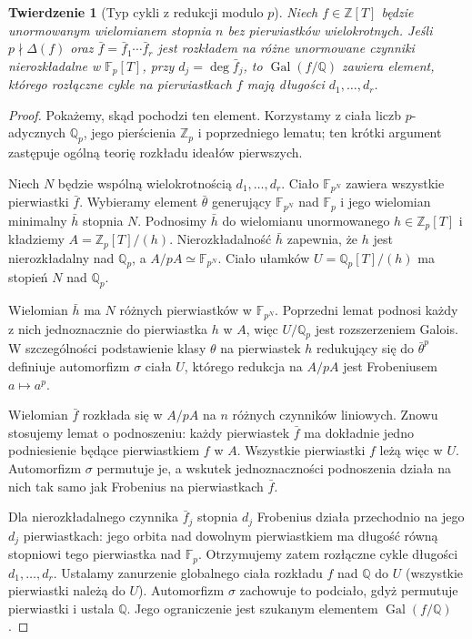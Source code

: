 \documentclass[11pt,a4paper,oneside]{book}
\numberwithin{equation}{section}
\theoremstyle{plain}
\newtheorem{twierdzenie}{Twierdzenie}[chapter]
\theoremstyle{definition}
\theoremstyle{remark}
\newcommand{\Q}{\mathbb{Q}}
\newcommand{\Z}{\mathbb{Z}}
\newcommand{\F}{\mathbb{F}}
\newcommand{\Gal}{\operatorname{Gal}}
\begin{document}
\begin{twierdzenie}[Typ cykli z redukcji modulo $p$]
Niech $f\in\Z[T]$ będzie unormowanym wielomianem stopnia $n$ bez pierwiastków wielokrotnych. Jeśli $p\nmid\Delta(f)$ oraz
$\bar f=\bar f_1\cdots\bar f_r$ jest rozkładem na różne unormowane czynniki nierozkładalne w $\F_p[T]$, przy $d_j=\deg\bar f_j$, to $\Gal(f/\Q)$ zawiera element, którego rozłączne cykle na pierwiastkach $f$ mają długości $d_1,\dots,d_r$.
\end{twierdzenie}
\begin{proof}
Pokażemy, skąd pochodzi ten element. Korzystamy z ciała liczb $p$-adycznych $\Q_p$, jego pierścienia $\Z_p$ i poprzedniego lematu; ten krótki argument zastępuje ogólną teorię rozkładu ideałów pierwszych.

Niech $N$ będzie wspólną wielokrotnością $d_1,\dots,d_r$. Ciało $\F_{p^N}$ zawiera wszystkie pierwiastki $\bar f$. Wybieramy element $\bar\theta$ generujący $\F_{p^N}$ nad $\F_p$ i jego wielomian minimalny $\bar h$ stopnia $N$. Podnosimy $\bar h$ do wielomianu unormowanego $h\in\Z_p[T]$ i kładziemy $A=\Z_p[T]/(h)$. Nierozkładalność $\bar h$ zapewnia, że $h$ jest nierozkładalny nad $\Q_p$, a $A/pA\simeq\F_{p^N}$. Ciało ułamków $U=\Q_p[T]/(h)$ ma stopień $N$ nad $\Q_p$.

Wielomian $\bar h$ ma $N$ różnych pierwiastków w $\F_{p^N}$. Poprzedni lemat podnosi każdy z nich jednoznacznie do pierwiastka $h$ w $A$, więc $U/\Q_p$ jest rozszerzeniem Galois. W szczególności podstawienie klasy $\theta$ na pierwiastek $h$ redukujący się do $\bar\theta^p$ definiuje automorfizm $\sigma$ ciała $U$, którego redukcja na $A/pA$ jest Frobeniusem $a\mapsto a^p$.

Wielomian $\bar f$ rozkłada się w $A/pA$ na $n$ różnych czynników liniowych. Znowu stosujemy lemat o podnoszeniu: każdy pierwiastek $\bar f$ ma dokładnie jedno podniesienie będące pierwiastkiem $f$ w $A$. Wszystkie pierwiastki $f$ leżą więc w $U$. Automorfizm $\sigma$ permutuje je, a wskutek jednoznaczności podnoszenia działa na nich tak samo jak Frobenius na pierwiastkach $\bar f$.

Dla nierozkładalnego czynnika $\bar f_j$ stopnia $d_j$ Frobenius działa przechodnio na jego $d_j$ pierwiastkach: jego orbita nad dowolnym pierwiastkiem ma długość równą stopniowi tego pierwiastka nad $\F_p$. Otrzymujemy zatem rozłączne cykle długości $d_1,\ldots,d_r$. Ustalamy zanurzenie globalnego ciała rozkładu $f$ nad $\Q$ do $U$ (wszystkie pierwiastki należą do $U$). Automorfizm $\sigma$ zachowuje to podciało, gdyż permutuje pierwiastki i ustala $\Q$. Jego ograniczenie jest szukanym elementem $\Gal(f/\Q)$.
\end{proof}
\end{document}
